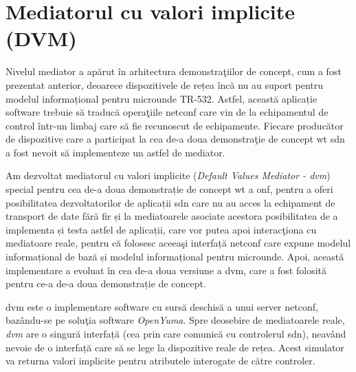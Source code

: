 \chapter{Mediatorul cu valori implicite (DVM)\label{ch:dvm_v01}}

\graphicspath{ {cap-dvm_v01/figures/} }

Nivelul mediator a apărut în arhitectura demonstraţiilor de concept, cum a fost prezentat anterior, deoarece dispozitivele de rețea încă nu au suport pentru modelul informațional pentru microunde TR-532. Astfel, această aplicație software trebuie să traducă operaţiile \gls{netconf} care vin de la echipamentul de control într-un limbaj care să fie recunoscut de echipamente. Fiecare producător de dispozitive care a participat la cea de-a doua demonstraţie de concept \gls{wt} \gls{sdn} a fost nevoit să implementeze un astfel de mediator.

Am dezvoltat mediatorul cu valori implicite (\textit{Default Values Mediator - \gls{dvm}}) special pentru cea de-a doua demonstrație de concept \gls{wt} a \gls{onf}, pentru a oferi posibilitatea dezvoltatorilor de aplicații \gls{sdn} care nu au acces la echipament de transport de date fără fir și la mediatoarele asociate acestora posibilitatea de a implementa și testa astfel de aplicații, care vor putea apoi interacţiona cu mediatoare reale, pentru că folosesc aceeaşi interfață \gls{netconf} care expune modelul informațional de bază și modelul informațional pentru microunde. Apoi, această implementare a evoluat în cea de-a doua versiune a \gls{dvm}, care a fost folosită pentru ce-a de-a doua demonstrație de concept.

\gls{dvm} este o implementare software cu sursă deschisă a unui server \gls{netconf}, bazându-se pe soluţia software \textit{OpenYuma}. Spre deosebire de mediatoarele reale, \textit{\gls{dvm}} are o singură interfață (cea prin care comunică cu controlerul \gls{sdn}), neavând nevoie de o interfață care să se lege la dispozitive reale de rețea. Acest simulator va returna valori implicite pentru atributele interogate de către controler.







